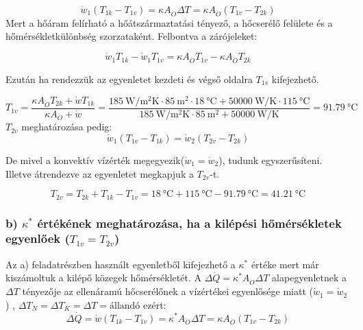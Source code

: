 \begin{equation}
  \dot{w}_1\left(T_{1k} - T_{1v}\right) = \kappa A_{\ddot{O}} \Delta T = \kappa A_{\ddot{O}} \left(T_{1v} - T_{2k}\right)
 \end{equation}
Mert a hőáram felírható a hőátszármaztatási tényező, a hőcserélő felülete és a hőmérsékletkülönbség szorzataként.
Felbontva a zárójeleket:

 \begin{equation}
\dot{w}_1 T_{1k} - \dot{w}_1 T_{1v} =  \kappa A_{\ddot{O}} T_{1v} -  \kappa A_{\ddot{O}} T_{2k}
 \end{equation}


Ezután ha rendezzük az egyenletet kezdeti és végső oldalra $T_{1v}$ kifejezhető.

\begin{equation}
T_{1v} = \frac{\kappa A_{\ddot{O}} T_{2k} + \dot{w} T_{1k}}{\kappa A_{\ddot{O}} + \dot{w}} =\frac{\SI{185}{\watt\per\meter\squared\kelvin}\cdot \SI{85}{\meter\squared}\cdot \SI{18}{\celsius} + \SI{50000}{\watt\per\kelvin} \cdot \SI{115}{\celsius}}{\SI{185}{\watt\per\meter\squared\kelvin}\cdot \SI{85}{\meter\squared} + \SI{50000}{\watt\per\kelvin}}= \SI{91.79}{\celsius}
\end{equation}
$T_{2v}$ meghatározása pedig:
\begin{equation}
\dot{w}_1\left(T_{1v} - T_{1k}\right) = \dot{w}_2\left(T_{2v} - T_{2k}\right)
\end{equation}

De mivel a konvektív vízérték megegyezik($\dot{w}_1 = \dot{w}_2$), tudunk egyszerűsíteni. Illetve átrendezve az egyenletet megkapjuk a $T_{2v}$-t.

\begin{equation}
T_{2v} = T_{2k} + T_{1k} - T_{1v} = \SI{18}{\celsius} + \SI{115}{\celsius} - \SI{91.79}{\celsius} = \SI{41.21}{\celsius}
\end{equation}

\subsubsection*{b) $\kappa^*$ értékének meghatározása, ha a kilépési hőmérsékletek egyenlőek ($T_{1v} = T_{2v}$) }
Az a) feladatrészben használt egyenletből kifejezhető a $\kappa^*$ értéke mert már kiszámoltuk a kilépő közegek hőmérsékletét. A $\Delta \dot{Q}= \kappa^* A_{\ddot{O}} \Delta T$ alapegyenletnek a $\Delta T$ tényezője az ellenáramú hőcserélőnek a vízértékei egyenlősége miatt ($\dot{w}_1 = \dot{w}_2$) ,  $\Delta T_N = \Delta T_K = \Delta T = \textrm{állandó}$ ezért:
\vspace{1mm}
\begin{equation}
\Delta \dot{Q}=\dot{w}\left(T_{1k} - T_{1v}\right) = \kappa^* A_{\ddot{O}} \Delta T = \kappa A_{\ddot{O}} \left(T_{1v} - T_{2k}\right)
\end{equation}


